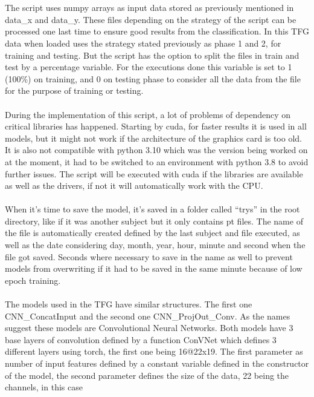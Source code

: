 \leavevmode\\
\\
The script uses numpy arrays as input data stored as previously mentioned in data\_x and data\_y. These files depending on the strategy of the script can be processed one last time to ensure good results from the classification. In this TFG data when loaded uses the strategy stated previously as phase 1 and 2, for training and testing. But the script has the option to split the files in train and test by a percentage variable. For the executions done this variable is set to 1 (100\%) on training, and 0 on testing phase to consider all the data from the file for the purpose of training or testing.
\\\\
During the implementation of this script, a lot of problems of dependency on critical libraries has happened. Starting by cuda, for faster results it is used in all models, but it might not work if the architecture of the graphics card is too old. It is also not compatible with python 3.10 which was the version being worked on at the moment, it had to be switched to an environment with python 3.8 to avoid further issues. The script will be executed with cuda if the libraries are available as well as the drivers, if not it will automatically work with the CPU.
\\\\
When it’s time to save the model, it’s saved in a folder called “trys” in the root directory, like if it was another subject but it only contains pt files. The name of the file is automatically created defined by the last subject and file executed, as well as the date considering day, month, year, hour, minute and second when the file got saved. Seconds where necessary to save in the name as well to prevent models from overwriting if it had to be saved in the same minute because of low epoch training.
\\\\
The models used in the TFG have similar structures. The first one CNN\_ConcatInput and the second one CNN\_ProjOut\_Conv. As the names suggest these models are Convolutional Neural Networks. Both models have 3 base layers of convolution defined by a function ConVNet which defines 3 different layers using torch, the first one being 16@22x19. The first parameter as number of input features defined by a constant variable defined in the constructor of the model, the second parameter defines the size of the data, 22 being the channels, in this case 
\\
